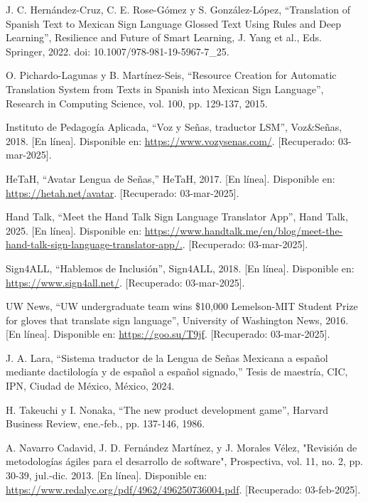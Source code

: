 \begin{thebibliography}{200}
    J. C. Hernández-Cruz, C. E. Rose-Gómez y S. González-López, “Translation of Spanish Text to Mexican Sign Language Glossed Text Using Rules and Deep Learning”, Resilience and Future of Smart Learning, J. Yang et al., Eds. Springer, 2022. doi: 10.1007/978-981-19-5967-7\_25.

    O. Pichardo-Lagunas y B. Martínez-Seis, “Resource Creation for Automatic Translation System from Texts in Spanish into Mexican Sign Language”, Research in Computing Science, vol. 100, pp. 129-137, 2015.

    Instituto de Pedagogía Aplicada, “Voz y Señas, traductor LSM”, Voz\&Señas, 2018. [En línea]. Disponible en: \url{https://www.vozysenas.com/}. [Recuperado: 03-mar-2025].

    HeTaH, “Avatar Lengua de Señas,” HeTaH, 2017. [En línea]. Disponible en: \url{https://hetah.net/avatar}. [Recuperado: 03-mar-2025].

    Hand Talk, “Meet the Hand Talk Sign Language Translator App”, Hand Talk, 2025. [En línea]. Disponible en: \url{https://www.handtalk.me/en/blog/meet-the-hand-talk-sign-language-translator-app/.}. [Recuperado: 03-mar-2025].

    Sign4ALL, “Hablemos de Inclusión”, Sign4ALL, 2018. [En línea]. Disponible en: \url{https://www.sign4all.net/}. [Recuperado: 03-mar-2025].

    UW News, “UW undergraduate team wins \$10,000 Lemelson-MIT Student Prize for gloves that translate sign language”, University of Washington News, 2016. [En línea]. Disponible en: \url{https://goo.su/T9jf}. [Recuperado: 03-mar-2025].

    J. A. Lara, “Sistema traductor de la Lengua de Señas Mexicana a español mediante dactilología y de español a español signado,” Tesis de maestría, CIC, IPN, Ciudad de México, México, 2024.

    H. Takeuchi y I. Nonaka, “The new product development game”, Harvard Business Review, ene.-feb., pp. 137-146, 1986.

    A. Navarro Cadavid, J. D. Fernández Martínez, y J. Morales Vélez, "Revisión de metodologías ágiles para el desarrollo de software", Prospectiva, vol. 11, no. 2, pp. 30-39, jul.-dic. 2013. [En línea]. Disponible en: \url{https://www.redalyc.org/pdf/4962/496250736004.pdf}. [Recuperado: 03-feb-2025].


\end{thebibliography}
